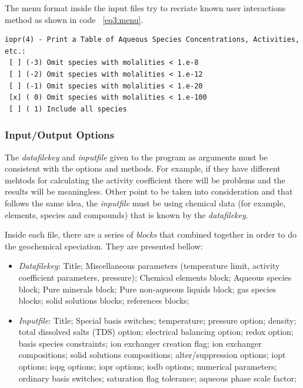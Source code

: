 \documentclass[ppgc,mestrado,english]{iiufrgs}
\begin{document}
The menu format inside the input files try to recriate known user interactions method as shown in code ~\ref{eq3:menu}.

\begin{lstlisting}[frame=single, caption=Menu Option inside \emph{EQ3/6} input files that mimics a "radio button", label=eq3:menu]
iopr(4) - Print a Table of Aqueous Species Concentrations, Activities, etc.: 
 [ ] (-3) Omit species with molalities < 1.e-8 
 [ ] (-2) Omit species with molalities < 1.e-12 
 [ ] (-1) Omit species with molalities < 1.e-20 
 [x] ( 0) Omit species with molalities < 1.e-100 
 [ ] ( 1) Include all species 
\end{lstlisting}

\subsubsection{Input/Output Options}
The \emph{datafilekey} and \emph{inputfile} given to the program as arguments must be consistent with the options and methods. For example, if they have different mehtods for calculating the activity coefficient there will be problems and the results will be meaningless. Other point to be taken into consideration and that follows the same idea, the \emph{inputfile} must be using chemical data (for example, elements, species and compounds) that is known by the \emph{datafilekey}. 

Inside each file, there are a series of \emph{blocks} that combined together in order to do the geochemical speciation. They are presented bellow:
\begin{itemize}
\item \emph{Datafilekey}: Title; Miscellaneous parameters (temperature limit, activity coefficient parameters, pressure); Chemical elements block; Aqueous species block; Pure minerals block; Pure non-aqueous liquids block; gas species blocks; solid solutions blocks; references blocks;
\item \emph{Inputfile}: Title; Special basis switches; temperature; pressure option; density; total dissolved salts (TDS) option; electrical balancing option; redox option; basis species constraints; ion exchanger creation flag; ion exchanger compositions; solid solutions compositions; alter/suppression options; iopt options; iopg options; iopr options; iodb options; numerical parameters; ordinary basis switches; saturation flag tolerance; aqueous phase scale factor;
\end{itemize}
\end{document}
